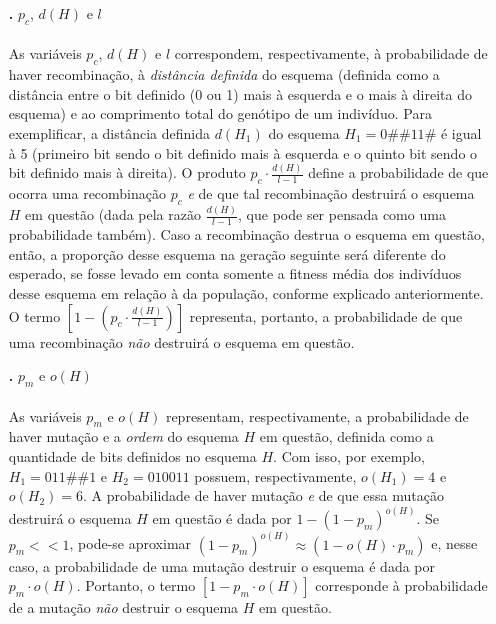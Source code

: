 \documentclass{report}
\begin{document}
\begin{itemize}
\item[\textbf{.}] $p_c$, $d(H)$ e $l$

\paragraph{} As variáveis $p_c$, $d(H)$ e $l$ correspondem, respectivamente, à probabilidade de haver recombinação, à \textit{distância definida} do esquema (definida como a distância entre o bit definido (0 ou 1) mais à esquerda e o mais à direita do esquema) e ao comprimento total do genótipo de um indivíduo. Para exemplificar, a distância definida $d(H_1)$ do esquema $H_1 = 0\#\#11\#$ é igual à 5 (primeiro bit sendo o bit definido mais à esquerda e o quinto bit sendo o bit definido mais à direita). O produto $p_c \cdot \frac{d(H)}{l-1}$ define a probabilidade de que ocorra uma recombinação $p_c$ \textit{e} de que tal recombinação destruirá o esquema $H$ em questão (dada pela razão $\frac{d(H)}{l-1}$, que pode ser pensada como uma probabilidade também). Caso a recombinação destrua o esquema em questão, então, a proporção desse esquema na geração seguinte será diferente do esperado, se fosse levado em conta somente a fitness média dos indivíduos desse esquema em relação à da população, conforme explicado anteriormente. O termo $\left[1 - \left(p_c \cdot \frac{d(H)}{l-1}\right)\right]$ representa, portanto, a probabilidade de que uma recombinação \textit{não} destruirá o esquema em questão.

\item[\textbf{.}] $p_m$ e $o(H)$

\paragraph{} As variáveis $p_m$ e $o(H)$ representam, respectivamente, a probabilidade de haver mutação e a \textit{ordem} do esquema $H$ em questão, definida como a quantidade de bits definidos no esquema $H$. Com isso, por exemplo, $H_1 = 011\#\#1$ e $H_2 = 010011$ possuem, respectivamente, $o(H_1) = 4$ e $o(H_2) = 6$. A probabilidade de haver mutação \textit{e} de que essa mutação destruirá o esquema $H$ em questão é dada por $1 - (1 - p_m)^{o(H)}$. Se $p_m << 1$, pode-se aproximar $(1 - p_m)^{o(H)} \approx	(1 - o(H)\cdot p_m)$ e, nesse caso, a probabilidade de uma mutação destruir o esquema é dada por $p_m \cdot o(H)$. Portanto, o termo $[1 - p_m \cdot o(H)]$ corresponde à probabilidade de a mutação \textit{não} destruir o esquema $H$ em questão.

\end{itemize}
\end{document}
